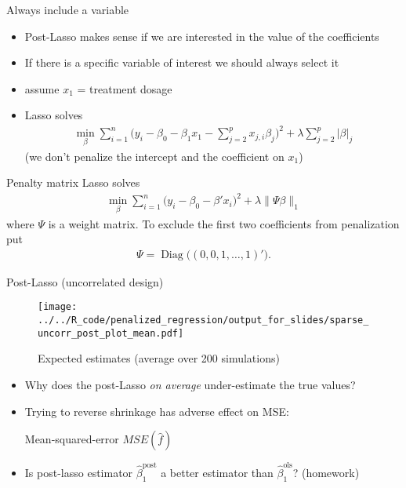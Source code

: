 \documentclass[xcolor=dvipsnames]{beamer}
\DeclareMathOperator{\diag}{Diag}
\begin{document}
\begin{frame}{Always include a variable}
\begin{itemize}[<+->]
  \item Post-Lasso makes sense if we are interested in the value of the coefficients
  \item If there is a specific variable of interest we should always select it
  \item assume $x_1$ = treatment dosage
  \item Lasso solves 
  \begin{align*}
    \min_{\beta} \sum_{i=1}^n \Big(y_i - \beta_0 - \beta_1 x_1 - \sum_{j = 2}^p x_{j, i} \beta_j \Big)^2 + \lambda \sum_{j = 2}^p \lvert\beta\rvert_j   
  \end{align*}
  (we don't penalize the intercept and the coefficient on $x_1$)
\end{itemize}
\end{frame}

\begin{frame}{Penalty matrix}
Lasso solves 
  \begin{align*}
    \min_{\beta} \sum_{i=1}^n \big(y_i - \beta_0 - \beta' x_i \big)^2 + \lambda \lVert \Psi \beta \rVert_1  
  \end{align*}
where $\Psi$ is a weight matrix. To exclude the first two coefficients from penalization put
\begin{align*}
  \Psi = \diag\big((0, 0, 1, \dotsc, 1)'\big).
\end{align*}
\end{frame}

\begin{frame}{Post-Lasso (uncorrelated design)}
\begin{figure}
  \texttt{[image: ../../R\_code/penalized\_regression/output\_for\_slides/sparse\_uncorr\_post\_plot\_mean.pdf]}
   \caption{Expected estimates (average over 200 simulations)}
\end{figure}
\end{frame}

\begin{frame}{}
  
  \begin{itemize}[<+->]
    \item 
    Why does the post-Lasso \emph{on average} under-estimate the true values?
    \item Trying to reverse shrinkage has adverse effect on MSE:  
    \begin{table}
    
      \caption{Mean-squared-error $MSE(\hat{f})$}
    \end{table}
    \item 
    Is post-lasso estimator $\hat{\beta}_1^{\text{post}}$ a better estimator than $\hat{\beta}_1^{\text{ols}}$? (homework)
  \end{itemize}
\end{frame}
\end{document}

